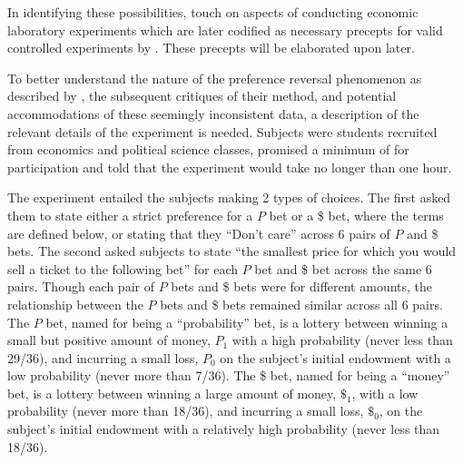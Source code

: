 \documentclass[../main.tex]{subfiles}
\begin{document}
In identifying these possibilities, \textcite{Grether1979} touch on aspects of conducting economic laboratory experiments which are later codified as necessary precepts for valid controlled experiments by \textcite{Smith1982}.
These precepts will be elaborated upon later.

To better understand the nature of the preference reversal phenomenon as described by \textcite{Grether1979}, the subsequent critiques of their method, and potential accommodations of these seemingly inconsistent data, a description of the relevant details of the experiment is needed.
Subjects were students recruited from economics and political science classes, promised a minimum of  for participation and told that the experiment would take no longer than one hour.

The experiment entailed the subjects making 2 types of choices.
The first asked them to state either a strict preference for a $P$ bet or a {\$} bet, where the terms are defined below, or stating that they \enquote{Don't care} across 6 pairs of $P$ and {\$} bets.
The second asked subjects to state \enquote{the smallest price for which you would sell a ticket to the following bet} \parencite*[630]{Grether1979} for each $P$ bet and {\$} bet across the same 6 pairs.
Though each pair of $P$ bets and {\$} bets were for different amounts, the relationship between the $P$ bets and {\$} bets remained similar across all 6 pairs.
The $P$ bet, named for being a \enquote{probability} bet, is a lottery between winning a small but positive amount of money, $P_1$ with a high probability (never less than 29/36), and incurring a small loss, $P_0$ on the subject's initial endowment with a low probability (never more than 7/36).
The {\$} bet, named for being a \enquote{money} bet, is a lottery between winning a large amount of money, ${\$}_1$, with a low probability (never more than 18/36), and incurring a small loss, ${\$}_0$, on the subject's initial endowment with a relatively high probability (never less than 18/36).
\end{document}
